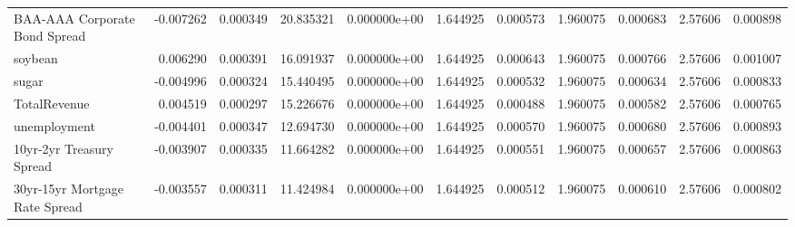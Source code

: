 \documentclass[12pt,a4paper,english]{article}
\begin{document}
{{\begin{tabular}{@{}lrrrrrrrrrr@{}}
			BAA-AAA Corporate Bond Spread  & -0.007262                & 0.000349                    & 20.835321                 & 0.000000e+00                             & 1.644925                      & 0.000573                      & 1.960075                     & 0.000683                     & 2.57606                      & 0.000898                     \\
			soybean                        & 0.006290                 & 0.000391                    & 16.091937                 & 0.000000e+00                             & 1.644925                      & 0.000643                      & 1.960075                     & 0.000766                     & 2.57606                      & 0.001007                     \\
			sugar                          & -0.004996                & 0.000324                    & 15.440495                 & 0.000000e+00                             & 1.644925                      & 0.000532                      & 1.960075                     & 0.000634                     & 2.57606                      & 0.000833                     \\
			TotalRevenue                   & 0.004519                 & 0.000297                    & 15.226676                 & 0.000000e+00                             & 1.644925                      & 0.000488                      & 1.960075                     & 0.000582                     & 2.57606                      & 0.000765                     \\
			unemployment                   & -0.004401                & 0.000347                    & 12.694730                 & 0.000000e+00                             & 1.644925                      & 0.000570                      & 1.960075                     & 0.000680                     & 2.57606                      & 0.000893                     \\
			10yr-2yr Treasury Spread       & -0.003907                & 0.000335                    & 11.664282                 & 0.000000e+00                             & 1.644925                      & 0.000551                      & 1.960075                     & 0.000657                     & 2.57606                      & 0.000863                     \\
			30yr-15yr Mortgage Rate Spread & -0.003557                & 0.000311                    & 11.424984                 & 0.000000e+00                             & 1.644925                      & 0.000512                      & 1.960075                     & 0.000610                     & 2.57606                      & 0.000802                     \\

\end{tabular}}}
\end{document}

